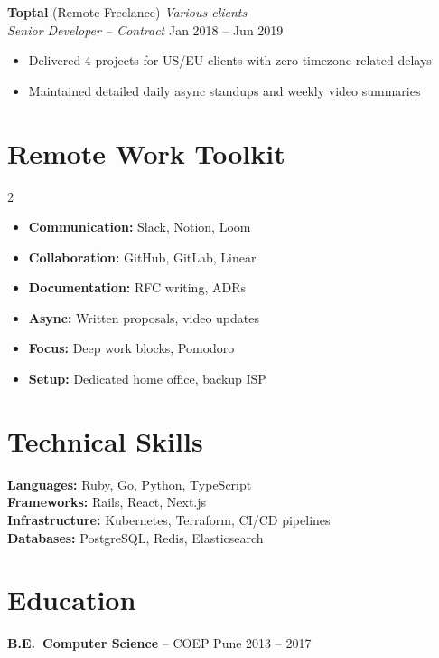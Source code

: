 \documentclass[10pt,letterpaper]{article}
\begin{document}
\textbf{Toptal} (Remote Freelance) \hfill \textit{Various clients}\\
\textit{Senior Developer -- Contract} \hfill Jan 2018 -- Jun 2019
\begin{itemize}
\item Delivered 4 projects for US/EU clients with zero timezone-related delays
\item Maintained detailed daily async standups and weekly video summaries
\end{itemize}

\section{Remote Work Toolkit}
\begin{multicols}{2}
\begin{itemize}[label=\color{remoteblue}]
\item \textbf{Communication:} Slack, Notion, Loom
\item \textbf{Collaboration:} GitHub, GitLab, Linear
\item \textbf{Documentation:} RFC writing, ADRs
\item \textbf{Async:} Written proposals, video updates
\item \textbf{Focus:} Deep work blocks, Pomodoro
\item \textbf{Setup:} Dedicated home office, backup ISP
\end{itemize}
\end{multicols}

\section{Technical Skills}
\textbf{Languages:} Ruby, Go, Python, TypeScript\\
\textbf{Frameworks:} Rails, React, Next.js\\
\textbf{Infrastructure:} Kubernetes, Terraform, CI/CD pipelines\\
\textbf{Databases:} PostgreSQL, Redis, Elasticsearch

\section{Education}
\textbf{B.E.\ Computer Science} -- COEP Pune \hfill 2013 -- 2017
\end{document}
